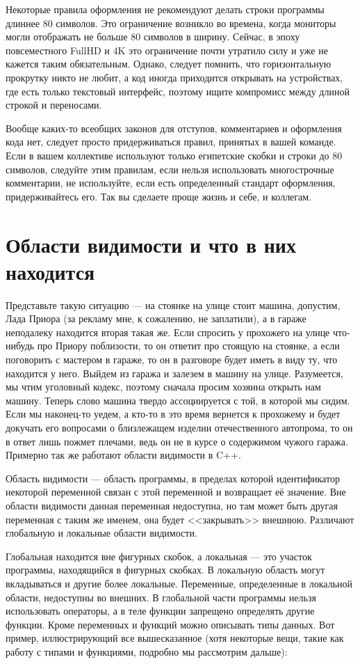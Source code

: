 \documentclass{article}
\begin{document}
Некоторые правила оформления не рекомендуют делать строки программы длиннее 80 символов. Это ограничение возникло во времена, когда мониторы могли отображать не больше 80 символов в ширину. Сейчас, в эпоху повсеместного FullHD и 4K это ограничение почти утратило силу и уже не кажется таким обязательным. Однако, следует помнить, что горизонтальную прокрутку никто не любит, а код иногда приходится открывать на устройствах, где есть только текстовый интерфейс, поэтому ищите компромисс между длиной строкой и переносами.

Вообще каких-то всеобщих законов для отступов, комментариев и оформления кода нет, следует просто придерживаться правил, принятых в вашей команде. Если в вашем коллективе используют только египетские скобки и строки до 80 символов, следуйте этим правилам, если нельзя использовать многострочные комментарии, не используйте, если есть определенный стандарт оформления, придерживайтесь его. Так вы сделаете проще жизнь и себе, и коллегам.

\section*{Области видимости и что в них находится}

Представьте такую ситуацию --- на стоянке на улице стоит машина, допустим, Лада Приора (за рекламу мне, к сожалению, не заплатили), а в гараже неподалеку находится вторая такая же. Если спросить у прохожего на улице что-нибудь про Приору поблизости, то он ответит про стоящую на стоянке, а если поговорить с мастером в гараже, то он в разговоре будет иметь в виду ту, что находится у него. Выйдем из гаража и залезем в машину на улице. Разумеется, мы чтим уголовный кодекс, поэтому сначала просим хозяина открыть нам машину. Теперь слово машина твердо ассоциируется с той, в которой мы сидим. Если мы наконец-то уедем, а кто-то в это время вернется к прохожему и будет докучать его вопросами о близлежащем изделии отечественного автопрома, то он в ответ лишь пожмет плечами, ведь он не в курсе о содержимом чужого гаража. Примерно так же работают области видимости в C++.

Область видимости --- область программы, в пределах которой идентификатор некоторой переменной связан с этой переменной и возвращает её значение. Вне области видимости данная переменная недоступна, но там может быть другая переменная с таким же именем, она будет <<закрывать>> внешнюю. Различают глобальную и локальные области видимости. 

Глобальная находится вне фигурных скобок, а локальная --- это участок программы, находящийся в фигурных скобках. В локальную область могут вкладываться и другие более локальные. Переменные, определенные в локальной области, недоступны во внешних. В глобальной части программы нельзя использовать операторы, а в теле функции запрещено определять другие функции. Кроме переменных и функций можно описывать типы данных. Вот пример, иллюстрирующий все вышесказанное (хотя некоторые вещи, такие как работу с типами и функциями, подробно мы рассмотрим дальше):
\end{document}
